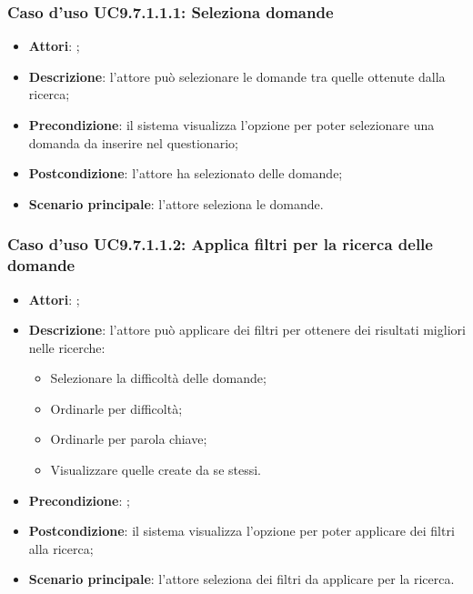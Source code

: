 			 \subsubsection{Caso d'uso UC9.7.1.1.1: Seleziona domande}
			 \label{UC9.7.1.1.1}
			 \begin{itemize}
			 	\item \textbf{Attori}: \uaupro{};
			 	\item \textbf{Descrizione}: l'attore può selezionare le domande tra quelle ottenute dalla ricerca;
			 	\item \textbf{Precondizione}: il sistema visualizza l'opzione per poter selezionare una domanda da inserire nel questionario;
			 	\item \textbf{Postcondizione}: l'attore ha selezionato delle domande; 
			 	\item \textbf{Scenario principale}: l'attore seleziona le domande.
			 \end{itemize}
			 
			 \subsubsection{Caso d'uso UC9.7.1.1.2: Applica filtri per la ricerca delle domande}
			 \label{UC9.7.1.1.2}
			 \begin{itemize}
			 	\item \textbf{Attori}: \uaupro{};
			 	\item \textbf{Descrizione}: l'attore può applicare dei filtri per ottenere dei risultati migliori nelle ricerche: 
				 	\begin{itemize}
						\item Selezionare la difficoltà delle domande;
						\item Ordinarle per difficoltà;
						\item Ordinarle per parola chiave;
						\item Visualizzare quelle create da se stessi.
				 	\end{itemize}
			 	\item \textbf{Precondizione}: ;
			 	\item \textbf{Postcondizione}: il sistema visualizza l'opzione per poter applicare dei filtri alla ricerca; 
			 	\item \textbf{Scenario principale}: l'attore seleziona dei filtri da applicare per la ricerca.
			 \end{itemize}
		 
